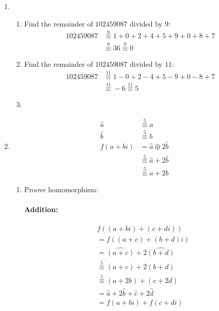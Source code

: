 \documentclass[12pt]{article}
\begin{document}
\begin{enumerate}
	\item
		\begin{enumerate}
			\item Find the remainder of $102459087$ divided by $9$:
				\begin{align*}
					102459087 &\overset{9}{\equiv} 1+0+2+4+5+9+0+8+7\\
										&\overset{9}{\equiv} 36 \overset{9}{\equiv} 0
				\end{align*}

			\item Find the remainder of $102459087$ divided by $11$:
					\begin{align*}
						102459087 &\overset{11}{\equiv} 1-0+2-4+5-9+0-8+7\\
											&\overset{11}{\equiv} -6 \overset{11}{\equiv} 5
					\end{align*}

			\item 

		\end{enumerate}

	\item
		\begin{align*}
			\hat{a} &\overset{5}{\equiv} a\\
			\hat{b} &\overset{5}{\equiv} b\\
			f(a+bi) &= \hat{a} \oplus 2\hat{b}\\
							&\overset{5}{\equiv} \hat{a} + 2\hat{b}\\
							&\overset{5}{\equiv} a + 2b
		\end{align*}

		\begin{enumerate}
			\item Proove homomorphism:
				\paragraph{Addition:} 
				\begin{align*}
				&f((a+bi) + (c+di)) \\
				&= f((a+c) + (b+d)i) \\
				&= \hat{(a+c)} + 2 \hat{(b+d)}\\
				&\overset{5}{\equiv} (a+c) + 2(b+d)\\
				&\overset{5}{\equiv} (a+ 2b) + (c + 2d)\\
				&= \hat{a} + 2 \hat{b} + \hat{c} + 2 \hat{d}\\
				&= f(a+bi) + f(c+di)
				\end{align*}


\end{enumerate}
\end{enumerate}
\end{document}
